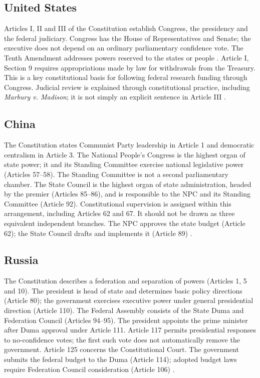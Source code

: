 \subsection{United States}
\label{section-gsf-united-states}

Articles I, II and III of the Constitution
establish
Congress, the presidency and the federal
judiciary.
Congress has the House of Representatives and
Senate;
the executive does not depend on an ordinary
parliamentary confidence vote.
The Tenth Amendment addresses powers reserved
to the
states or people
\cite{gsf-us-constitution,
gsf-us-bill-rights}.
Article I, Section 9 requires appropriations
made
by law for withdrawals from the Treasury.
This is
a key constitutional basis for following
federal
research funding through Congress.
Judicial review is explained through
constitutional
practice, including \emph{Marbury v.
Madison};
it is not simply an explicit sentence in
Article III
\cite{gsf-us-court}.

\subsection{China}
\label{section-gsf-china}

The Constitution states Communist Party
leadership
in Article 1 and democratic centralism in
Article 3.
The National People's Congress is the highest
organ
of state power; it and its Standing Committee
exercise
national legislative power (Articles 57--58).
The Standing Committee is not a second
parliamentary
chamber. The State Council is the highest
organ of
state administration, headed by the premier
(Articles 85--86), and is responsible to the
NPC
and its Standing Committee (Article 92).
Constitutional supervision is assigned within
this
arrangement, including Articles 62 and 67.
It should not be drawn as three equivalent
independent
branches. The NPC approves the state budget
(Article 62); the State Council drafts and
implements it (Article 89)
\cite{gsf-cn-constitution}.

\subsection{Russia}
\label{section-gsf-russia}

The Constitution describes a federation and
separation
of powers (Articles 1, 5 and 10).
The president is head of state and determines
basic
policy directions (Article 80); the
government
exercises executive power under general
presidential
direction (Article 110).
The Federal Assembly consists of the State
Duma and
Federation Council (Articles 94--95).
The president appoints the prime minister
after
Duma approval under Article 111.
Article 117 permits presidential responses to
no-confidence votes; the first such vote does
not
automatically remove the government.
Article 125 concerns the Constitutional
Court.
The government submits the federal budget to
the Duma (Article 114); adopted budget laws
require Federation Council consideration
(Article 106) \cite{gsf-ru-constitution}.

